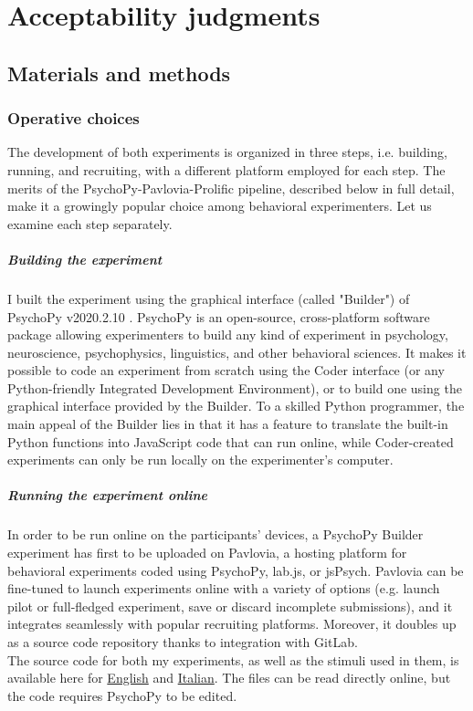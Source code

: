 \setchapterpreamble[u]{\margintoc}
\chapter{Acceptability judgments}

\section{Materials and methods} 


\subsection{Operative choices} 
The development of both experiments is organized in three steps, i.e. building, running, and recruiting, with a different platform employed for each step. The merits of the PsychoPy-Pavlovia-Prolific pipeline, described below in full detail, make it a growingly popular choice among behavioral experimenters. Let us examine each step separately.

\paragraph{Building the experiment} I built the experiment using the graphical interface (called "Builder") of PsychoPy v2020.2.10 \parencite{peirce2019psychopy2}. PsychoPy is an open-source, cross-platform software package allowing experimenters to build any kind of experiment in psychology, neuroscience, psychophysics, linguistics, and other behavioral sciences. It makes it possible to code an experiment from scratch using the Coder interface (or any Python-friendly Integrated Development Environment), or to build one using the graphical interface provided by the Builder. To a skilled Python programmer, the main appeal of the Builder lies in that it has a feature to translate the built-in Python functions into JavaScript code that can run online, while Coder-created experiments can only be run locally on the experimenter's computer.

\paragraph{Running the experiment online} In order to be run online on the participants' devices, a PsychoPy Builder experiment has first to be uploaded on Pavlovia, a hosting platform for behavioral experiments coded using PsychoPy, lab.js, or jsPsych. Pavlovia can be fine-tuned to launch experiments online with a variety of options (e.g. launch pilot or full-fledged experiment, save or discard incomplete submissions), and it integrates seamlessly with popular recruiting platforms. Moreover, it doubles up as a source code repository thanks to integration with GitLab.\\
The source code for both my experiments, as well as the stimuli used in them, is available here for \href{https://gitlab.pavlovia.org/gcappelli/grammaticality_eng}{English} and \href{https://gitlab.pavlovia.org/gcappelli/grammaticality_ita}{Italian}. The files can be read directly online, but the code requires PsychoPy to be edited.

